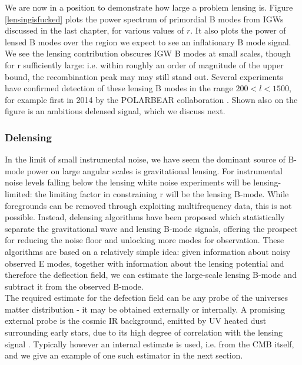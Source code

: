 \documentclass[a4paper,10pt]{article}
\begin{document}
We are now in a position to demonstrate how large a problem lensing is. Figure \ref{lensingisfucked} plots the power spectrum of primordial B modes from IGWs discussed in the last chapter, for various values of $r$. It also plots the power of lensed B modes over the region we expect to see an inflationary B mode signal. We see the lensing contribution obscures IGW B modes at small scales, though for r sufficiently large: i.e. within roughly an order of magnitude of the upper bound, the recombination peak may may still stand out. Several experiments have confirmed detection of these lensing B modes in the range $200<l<1500$, for example first in 2014 by the POLARBEAR collaboration \cite{polarbear}. Shown also on the figure is an ambitious delensed signal, which we discuss next.

\subsubsection{Delensing}

In the limit of small instrumental noise, we have seem the dominant source of B-mode power on large angular scales is gravitational lensing. For instrumental noise levels falling below the lensing white noise experiments will be lensing-limited: the limiting factor in constraining r will be the lensing B-mode. While foregrounds can be removed through exploiting multifrequency data, this is not possible. Instead, delensing algorithms have been proposed  which statistically separate the gravitational wave and lensing B-mode signals, offering the prospect for reducing the noise floor and unlocking more modes for observation. These algorithms are based on a relatively simple idea: given information about noisy observed E modes, together with information about the lensing potential and therefore the deflection field, we can estimate the large-scale lensing B-mode and subtract it from the observed B-mode.\\

The required estimate for the defection field can be any probe of the universes matter distribution -  it may be obtained externally or internally. A promising external probe is the cosmic IR background, emitted by UV heated dust surrounding early stars, due to its high degree of correlation with the lensing signal \cite{sherwin}. Typically however an internal estimate is used, i.e. from the CMB itself, and we give an example of one such estimator in the next section. \\
\end{document}

